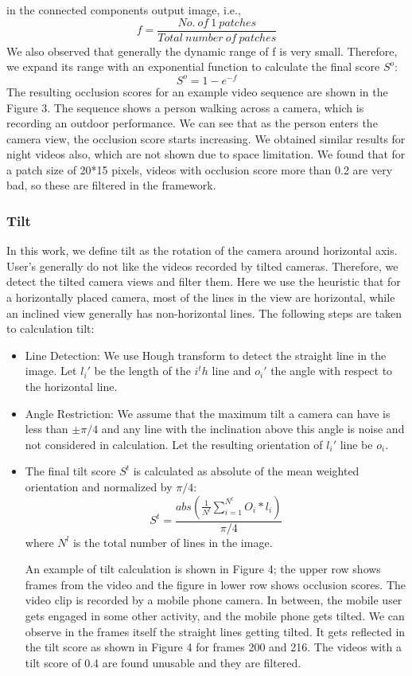 \documentclass{sig-alternate}
\providecommand{\DIFadd}[1]{{\protect\color{blue}\uwave{#1}}} %
\providecommand{\DIFaddbegin}{} %
\providecommand{\DIFaddend}{} %
\begin{document}
\begin{itemize}
in the connected components output image, i.e.,
\[f = \frac{No.\ of\ 1\ patches}{Total\ number\ of\ patches}\tag{4}\]
We also observed that generally the dynamic range of f is very
small. Therefore, we expand its range with an exponential function
to calculate the final score $S^o$:
\[S^o = 1 - e^ {-f}\tag{5}\]
The resulting occlusion scores for an example video sequence
are shown in the Figure 3. The sequence shows a person walking
across a camera, which is recording an outdoor performance. We
can see that as the person enters the camera view, the occlusion
score starts increasing. We obtained similar results for night videos
also, which are not shown due to space limitation. We found that
for a patch size of 20*15 pixels, videos with occlusion score more
than 0.2 are very bad, so these are filtered in the framework.
 \end{itemize} 

\subsubsection{Tilt}
\DIFaddbegin \DIFadd{I am a new sentence.
}\DIFaddend In this work, we define tilt as the rotation of the camera around
horizontal axis. User’s generally do not like the videos recorded
by tilted cameras. Therefore, we detect the tilted camera views
and filter them. Here we use the heuristic that for a horizontally
placed camera, most of the lines in the view are horizontal, while
an inclined view generally has non-horizontal lines. The following
steps are taken to calculation tilt:
 \begin{itemize} 
\item Line Detection: We use Hough transform to detect the straight
line in the image. Let $l_i'$ be the length of the $i^th$ line and $o_i'$
the angle with respect to the horizontal line.
\item Angle Restriction: We assume that the maximum tilt a camera can
have is less than $\pm \pi/4$
and any line with the inclination above this angle is
noise and not considered in calculation.
Let the resulting orientation of $l_i'$ line be $o_i$.
\item The final tilt score $S^t$ is calculated as absolute of the mean
weighted orientation and normalized by $\pi/4$:
\[S^t = \frac{abs\left ( \frac{1}{N^l}\sum_{i=1}^{N^l}O_i*l_i \right )}{\pi/4}\tag{6}\]
where $N^l$ is the total number of lines in the image.


An example of tilt calculation is shown in Figure 4; the upper
row shows frames from the video and the figure in lower row shows
occlusion scores. The video clip is recorded by a mobile phone
camera. In between, the mobile user gets engaged in some other
activity, and the mobile phone gets tilted. We can observe in the
frames itself the straight lines getting tilted. It gets reflected in the
tilt score as shown in Figure 4 for frames 200 and 216. The videos
with a tilt score of 0.4 are found unusable and they are filtered.
 \end{itemize} 
\end{document}

